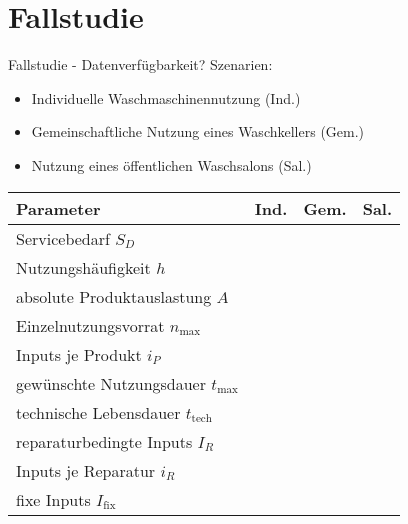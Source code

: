 \documentclass[beamer, xcolor=table]{beamer}
\newcommand{\I}[1]{I_\text{#1}}
\newcommand{\n}[1]{n_\text{#1}}
\renewcommand{\t}[1]{t_\text{#1}}
\begin{document}
\section{Fallstudie}
	\begin{frame}{Fallstudie - Datenverfügbarkeit?}
            Szenarien: 
            \begin{itemize}
                \item Individuelle Waschmaschinennutzung (Ind.)
                \item Gemeinschaftliche Nutzung eines Waschkellers (Gem.)
                \item Nutzung eines öffentlichen Waschsalons (Sal.)
            \end{itemize}
		\begin{center}
\pause
{}
            \begin{tabular}[h]{lccc}
                \hline
            \rowcolor{darkorange}
                Parameter & Ind. & Gem. & Sal.\\
                \hline
                Servicebedarf $S_D$ &&& \pause\\
                Nutzungshäufigkeit $h$ &&& \pause\\
                absolute Produktauslastung $A$ &&&\pause\\
                Einzelnutzungsvorrat $\n{max}$ &&&\pause\\
                Inputs je Produkt $i_P$ &&&\pause\\
                gewünschte Nutzungsdauer $\t{max}$ &&&\pause\\
                technische Lebensdauer $\t{tech}$ &&&\pause\\
                reparaturbedingte Inputs $I_R$ &&&\pause\\
                Inputs je Reparatur $i_R$ &&&\pause\\
                fixe Inputs $\I{fix}$ &&&\\
                \hline
            \end{tabular}

\end{center}
\end{frame}
\end{document}
